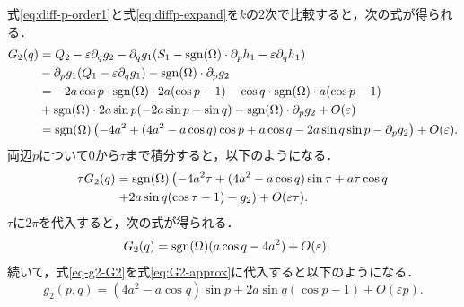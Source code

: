 \documentclass[../main]{subfiles}
\begin{document}
    式\eqref{eq:diff-p-order1}と式\eqref{eq:diffp-expand}を$k$の2次で比較すると，次の式が得られる．
    \begin{align}
        G_2(q)&=Q_2-\varepsilon\partial_q g_2-\partial_q g_1(S_1-\operatorname{sgn}(\Omega)\cdot \partial_ph_1-\varepsilon\partial_qh_1)\notag\\
        &-\partial_pg_1(Q_1-\varepsilon\partial_qg_1)-\operatorname{sgn}(\Omega)\cdot\partial_pg_2\notag\\
        &=-2a\cos p\cdot \operatorname{sgn}(\Omega) \cdot 2a(\cos p-1)-\cos q\cdot \operatorname{sgn}(\Omega) \cdot a(\cos p-1)\notag\\
        &+\operatorname{sgn}(\Omega)\cdot 2a\sin p(-2a\sin p-\sin q)-\operatorname{sgn}(\Omega) \cdot\partial_p g_2+O(\varepsilon)\notag\\
        &=\operatorname{sgn}(\Omega) \left(-4a^2+(4a^2-a\cos q)\cos p+a\cos q-2a\sin q\sin p-\partial_pg_2\right)+O(\varepsilon).
    \end{align}
    両辺$p$について$0$から$\tau$まで積分すると，以下のようになる．
    \begin{align}
        \tau G_2(q)&=\operatorname{sgn}(\Omega)\left(-4a^2\tau+(4a^2-a\cos q)\sin\tau+a\tau\cos q\right.\notag\\
        &\left.+2a\sin q(\cos\tau-1)-g_2\right)+O(\varepsilon\tau). 
        \label{eq-g2-G2}
    \end{align}
    $\tau$に$2\pi$を代入すると，次の式が得られる．
    \begin{align}
        G_2(q)&=\operatorname{sgn}(\Omega) (a\cos q-4a^2)+O(\varepsilon).
        \label{eq:G2-approx}
    \end{align}
    続いて，式\eqref{eq-g2-G2}を式\eqref{eq:G2-approx}に代入すると以下のようになる．
    \begin{equation}
        g_2(p,q)=(4a^2-a\cos q)\sin p+2a\sin q(\cos p-1)+O(\varepsilon p).
        \label{eq:g2-approx}
    \end{equation}
\end{document}
